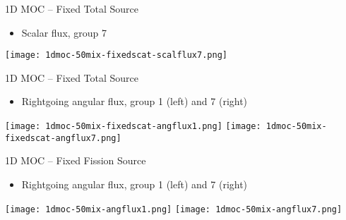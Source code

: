 
\begin{frame}[t]{1D MOC -- Fixed Total Source}

\begin{itemize}
    \item Scalar flux, group 7
\end{itemize}
\begin{center}
\texttt{[image: 1dmoc-50mix-fixedscat-scalflux7.png]}
\end{center}

\end{frame}


\begin{frame}[t]{1D MOC -- Fixed Total Source}

\begin{itemize}
    \item Rightgoing angular flux, group 1 (left) and 7 (right)
\end{itemize}

\begin{center}
\texttt{[image: 1dmoc-50mix-fixedscat-angflux1.png]} \texttt{[image: 1dmoc-50mix-fixedscat-angflux7.png]}
\end{center}

\end{frame}


\begin{frame}[t]{1D MOC -- Fixed Fission Source}

\begin{itemize}
    \item Rightgoing angular flux, group 1 (left) and 7 (right)
\end{itemize}
\begin{center}
\texttt{[image: 1dmoc-50mix-angflux1.png]} \texttt{[image: 1dmoc-50mix-angflux7.png]}
\end{center}

\end{frame}


